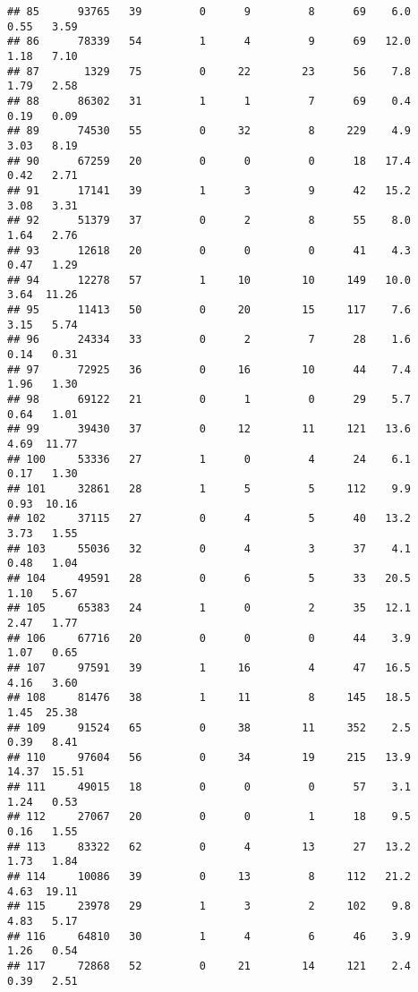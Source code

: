 \documentclass[
]{article}
\begin{document}
\begin{verbatim}
## 85      93765   39         0      9         8      69    6.0    0.55   3.59
## 86      78339   54         1      4         9      69   12.0    1.18   7.10
## 87       1329   75         0     22        23      56    7.8    1.79   2.58
## 88      86302   31         1      1         7      69    0.4    0.19   0.09
## 89      74530   55         0     32         8     229    4.9    3.03   8.19
## 90      67259   20         0      0         0      18   17.4    0.42   2.71
## 91      17141   39         1      3         9      42   15.2    3.08   3.31
## 92      51379   37         0      2         8      55    8.0    1.64   2.76
## 93      12618   20         0      0         0      41    4.3    0.47   1.29
## 94      12278   57         1     10        10     149   10.0    3.64  11.26
## 95      11413   50         0     20        15     117    7.6    3.15   5.74
## 96      24334   33         0      2         7      28    1.6    0.14   0.31
## 97      72925   36         0     16        10      44    7.4    1.96   1.30
## 98      69122   21         0      1         0      29    5.7    0.64   1.01
## 99      39430   37         0     12        11     121   13.6    4.69  11.77
## 100     53336   27         1      0         4      24    6.1    0.17   1.30
## 101     32861   28         1      5         5     112    9.9    0.93  10.16
## 102     37115   27         0      4         5      40   13.2    3.73   1.55
## 103     55036   32         0      4         3      37    4.1    0.48   1.04
## 104     49591   28         0      6         5      33   20.5    1.10   5.67
## 105     65383   24         1      0         2      35   12.1    2.47   1.77
## 106     67716   20         0      0         0      44    3.9    1.07   0.65
## 107     97591   39         1     16         4      47   16.5    4.16   3.60
## 108     81476   38         1     11         8     145   18.5    1.45  25.38
## 109     91524   65         0     38        11     352    2.5    0.39   8.41
## 110     97604   56         0     34        19     215   13.9   14.37  15.51
## 111     49015   18         0      0         0      57    3.1    1.24   0.53
## 112     27067   20         0      0         1      18    9.5    0.16   1.55
## 113     83322   62         0      4        13      27   13.2    1.73   1.84
## 114     10086   39         0     13         8     112   21.2    4.63  19.11
## 115     23978   29         1      3         2     102    9.8    4.83   5.17
## 116     64810   30         1      4         6      46    3.9    1.26   0.54
## 117     72868   52         0     21        14     121    2.4    0.39   2.51

\end{verbatim}
\end{document}
